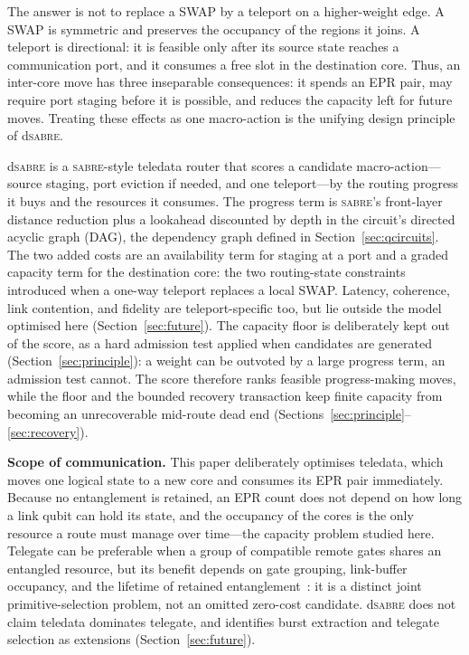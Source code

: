 \documentclass[journal]{IEEEtran}
\newcommand{\dSABRE}{d\textsc{sabre}}
\newcommand{\SABRE}{\textsc{sabre}}
\begin{document}
The answer is not to replace a SWAP by a teleport on a higher-weight edge. A
SWAP is symmetric and preserves the occupancy of the regions it joins. A
teleport is directional: it is feasible only after its source state reaches a
communication port, and it consumes a free slot in the destination core.
Thus, an inter-core move has three inseparable consequences: it spends an EPR
pair, may require port staging before it is possible, and reduces the capacity
left for future moves. Treating these effects as one macro-action is the
unifying design principle of \dSABRE{}.

\dSABRE{} is a \SABRE{}-style teledata router that scores a candidate
macro-action---source staging, port eviction if needed, and one
teleport---by the routing progress it buys and the resources it consumes. The
progress term is \SABRE{}'s front-layer distance reduction plus a lookahead
discounted by depth in the circuit's directed acyclic graph (DAG), the
dependency graph defined in Section~\ref{sec:qcircuits}. The two added
costs are an availability term for staging at a port and a graded capacity
term for the destination core: the two routing-state constraints introduced
when a one-way teleport replaces a local SWAP. Latency, coherence, link
contention, and fidelity are teleport-specific too, but lie outside the model
optimised here (Section~\ref{sec:future}). The capacity floor is deliberately
kept out of the score, as a hard admission test applied when candidates are
generated (Section~\ref{sec:principle}): a weight can be outvoted by a large
progress term, an admission test cannot. The score therefore ranks feasible
progress-making moves, while the floor and the bounded recovery transaction keep
finite capacity from becoming an unrecoverable mid-route dead end
(Sections~\ref{sec:principle}--\ref{sec:recovery}).

\textbf{Scope of communication.}
This paper deliberately optimises teledata, which moves one logical state to a
new core and consumes its EPR pair immediately. Because no entanglement is
retained, an EPR count does not depend on how long a link qubit can hold its
state, and the occupancy of the cores is the only resource a route must manage
over time---the capacity problem studied
here. Telegate can be preferable when a group of
compatible remote gates shares an entangled resource, but its benefit depends
on gate grouping, link-buffer occupancy, and the lifetime of retained
entanglement~\cite{eisert2000optimal}: it is a distinct joint
primitive-selection problem, not an omitted zero-cost candidate. \dSABRE{}
does not claim teledata dominates telegate, and identifies burst extraction and
telegate selection as extensions (Section~\ref{sec:future}).
\end{document}
